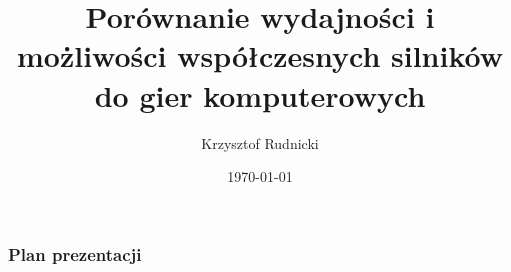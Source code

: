 \documentclass{beamer}
\title{\large Porównanie wydajności i możliwości współczesnych silników do gier komputerowych}
\author{Krzysztof Rudnicki}
\institute{
    \textbf{Promotor} \\
    dr inż. Michał Chwesiuk
}
\date{\scriptsize \today} %
\begin{document}
\begin{frame}
  \vspace{-0.5cm} %
  \maketitle
\end{frame}

\begin{frame}
\frametitle{Plan prezentacji}
\tableofcontents
\end{frame}

	
	
	
\end{document}
